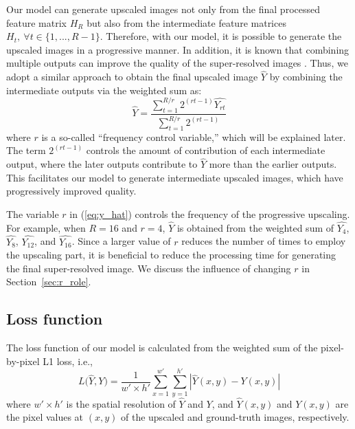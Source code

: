 \documentclass[runningheads]{llncs}
\begin{document}
Our model can generate upscaled images not only from the final processed feature matrix ${H}_{R}$ but also from the intermediate feature matrices ${H}_{t},~\forall {t}\in\{1, ..., R-1\}$.
Therefore, with our model, it is possible to generate the upscaled images in a progressive manner.
In addition, it is known that combining multiple outputs can improve the quality of the super-resolved images \cite{han2018image,kim2016deeply}.
Thus, we adopt a similar approach to obtain the final upscaled image $\widehat{Y}$ by combining the intermediate outputs via the weighted sum as:
\begin{equation}
\label{eq:y_hat}
\widehat{Y} = \frac{\sum_{t=1}^{R/r}{ {2}^{(rt-1)} \widehat{{Y}_{rt}} }}{\sum_{t=1}^{R/r}{ {2}^{(rt-1)} }}
\end{equation}
where $r$ is a so-called ``frequency control variable,'' which will be explained later.
The term ${2}^{(rt-1)}$ controls the amount of contribution of each intermediate output, where the later outputs contribute to $\widehat{Y}$ more than the earlier outputs.
This facilitates our model to generate intermediate upscaled images, which have progressively improved quality.

The variable $r$ in (\ref{eq:y_hat}) controls the frequency of the progressive upscaling.
For example, when $R=16$ and $r=4$, $\widehat{Y}$ is obtained from the weighted sum of $\widehat{{Y}_{4}}$, $\widehat{{Y}_{8}}$, $\widehat{{Y}_{12}}$, and $\widehat{{Y}_{16}}$.
Since a larger value of $r$ reduces the number of times to employ the upscaling part, it is beneficial to reduce the processing time for generating the final super-resolved image.
We discuss the influence of changing $r$ in Section~\ref{sec:r_role}.


\subsection{Loss function}

The loss function of our model is calculated from the weighted sum of the pixel-by-pixel L1 loss, i.e.,
\begin{equation}
\label{eq:loss}
L \big( \widehat{Y}, Y \big) = \frac{1}{w' \times h'} \sum_{x=1}^{w'} \sum_{y=1}^{h'} \left|  \widehat{Y}(x, y) - Y(x, y) \right|
\end{equation}
where $w' \times h'$ is the spatial resolution of $\widehat{Y}$ and $Y$, and $\widehat{Y}(x, y)$ and $Y(x, y)$ are the pixel values at $(x, y)$ of the upscaled and ground-truth images, respectively.
\end{document}
